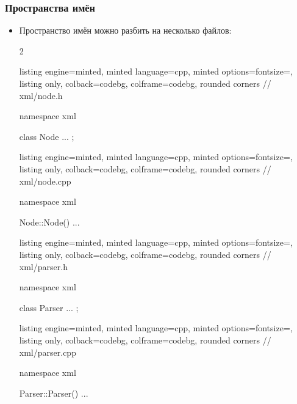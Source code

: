 \documentclass[10pt]{beamer}
\begin{document}
\begin{frame}[fragile]
\frametitle{Пространства имён}
\begin{itemize}
\item Пространство имён можно разбить на несколько файлов:
\begin{multicols}{2}
\begin{tcblisting}{listing engine=minted, minted language=cpp, minted options={fontsize=\scriptsize}, listing only, colback=codebg, colframe=codebg, rounded corners}
// xml/node.h

namespace xml {

  class Node { ... };

}
\end{tcblisting}
\begin{tcblisting}{listing engine=minted, minted language=cpp, minted options={fontsize=\scriptsize}, listing only, colback=codebg, colframe=codebg, rounded corners}
// xml/node.cpp

namespace xml {

  Node::Node() { ... }

}
\end{tcblisting}
\columnbreak
\begin{tcblisting}{listing engine=minted, minted language=cpp, minted options={fontsize=\scriptsize}, listing only, colback=codebg, colframe=codebg, rounded corners}
// xml/parser.h

namespace xml {

  class Parser { ... };
  
}
\end{tcblisting}
\begin{tcblisting}{listing engine=minted, minted language=cpp, minted options={fontsize=\scriptsize}, listing only, colback=codebg, colframe=codebg, rounded corners}
// xml/parser.cpp

namespace xml {

  Parser::Parser() { ... }

}
\end{tcblisting}
\end{multicols}
\end{itemize}
\end{frame}
\end{document}
